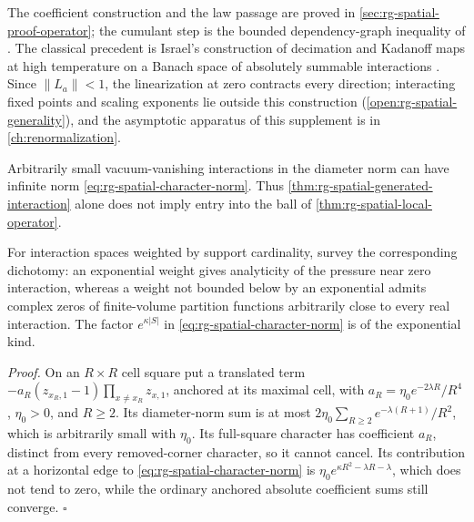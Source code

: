 The coefficient construction and the law passage are proved in
\cref{sec:rg-spatial-proof-operator}; the cumulant step is the bounded
dependency-graph inequality of \citet[Sec.~9.4.2, Eq.~(47)]{feray2016modphi}.
The classical precedent is Israel's construction of decimation and Kadanoff
maps at high temperature on a Banach space of absolutely summable
interactions \citep{Israel1981}\citep[Sec.~6.1.1]{VanEnterFernandezSokal1993}.
Since \(\|L_a\|<1\), the linearization at zero contracts every direction;
interacting fixed points and scaling exponents lie outside this construction
(\cref{open:rg-spatial-generality}), and the asymptotic apparatus of this
supplement is in \cref{ch:renormalization}.

Arbitrarily small vacuum-vanishing interactions in the diameter norm can
have infinite norm \cref{eq:rg-spatial-character-norm}. Thus
\cref{thm:rg-spatial-generated-interaction} alone does not imply entry into
the ball of \cref{thm:rg-spatial-local-operator}. 

For interaction spaces weighted by support cardinality,
\citet[Sec.~2.6.7]{VanEnterFernandezSokal1993} survey the corresponding
dichotomy: an exponential weight gives analyticity of the pressure near
zero interaction, whereas a weight not bounded below by an exponential
admits complex zeros of finite-volume partition functions arbitrarily close
to every real interaction. The factor \(e^{\kappa|S|}\) in
\cref{eq:rg-spatial-character-norm} is of the exponential kind.

\noindent\emph{Proof.}
On an \(R\times R\) cell square put a translated term
\(-a_R(z_{x_R,1}-1)\prod_{x\ne x_R}z_{x,1}\), anchored at its maximal cell,
with \(a_R=\eta_0e^{-2\lambda R}/R^4\), \(\eta_0>0\), and \(R\ge2\). Its
diameter-norm sum is at most \(2\eta_0\sum_{R\ge2}e^{-\lambda(R+1)}/R^2\),
which is arbitrarily small with \(\eta_0\). Its full-square character has
coefficient \(a_R\), distinct from every removed-corner character, so it
cannot cancel. Its contribution at a horizontal edge to
\cref{eq:rg-spatial-character-norm} is
\(\eta_0e^{\kappa R^2-\lambda R-\lambda}\), which does not tend to zero,
while the ordinary anchored absolute coefficient sums still converge.
\hfill\(\square\)

